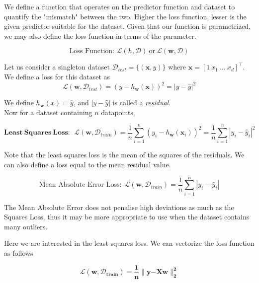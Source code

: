 \documentclass{report}
\newcommand{\tr}[1]{{{#1}^\top}} %
\newcommand{\w}{\mathbf{w}} %
\newcommand{\x}{\mathbf{x}}
\newcommand{\y}{\mathbf{y}}
\newcommand{\D}{\mathcal{D}}
\newcommand{\loss}{\mathcal{L}}
\begin{document}
We define a function that operates on the predictor function and dataset to quantify the "mismatch" between the two. Higher the loss function, lesser is the given predictor suitable for the dataset. Given that our function is parametrized, we may also define the loss function in terms of the parameter.

$$
  \text{Loss Function: } \loss(h,\D) ~\text{or}~ \loss(\w,\D)
$$

Let us consider a singleton dataset $\D_{test} =\{(\x,y)\}$ where $\x = \tr{\left[1~x_1~\ldots~x_d\right]}$. We define a loss for this dataset as
$$
  \loss(\w,\D_{test}) = (y-h_\w(\x))^2 = |y-\hat{y}|^2
$$

We define \(h_\w(x) = \hat{y}\), and \(|y-\hat{y}|\) is called a \emph{residual}. \\

Now for a dataset containing $n$ datapoints,

$$
  \mathbf{Least\ Squares\ Loss:} \ \  \loss(\w,\D_{train}) = \frac{1}{n} \sum_{i=1}^n(y_i-h_\w(\x_i))^2 = \frac{1}{n} \sum_{i=1}^n \left|y_i - \hat{y}_i\right|^2
$$

Note that the least squares loss is the mean of the squares of the residuals. We can also define a loss equal to the mean residual value.

$$
  \text{Mean Absolute Error Loss:} \ \ \loss({\w,\D_{train}}) = \frac{1}{n} \sum_{i=1}^n \left|y_i - \hat{y}_i\right|
$$

The Mean Absolute Error does not penalise high deviations as much as the Squares Loss, thus it may be more appropriate to use when the dataset contains many outliers.
\begin{figure}[htbp]
  \centering
\end{figure}

Here we are interested in the least squares loss. We can vectorize the loss function as follows

$$
  \boxed{\mathbf{\loss(\w, \D_{\text{train}}) = \frac{1}{n} \lVert \y \mathrm{-} X\w \rVert_2^2}}
$$
\end{document}

